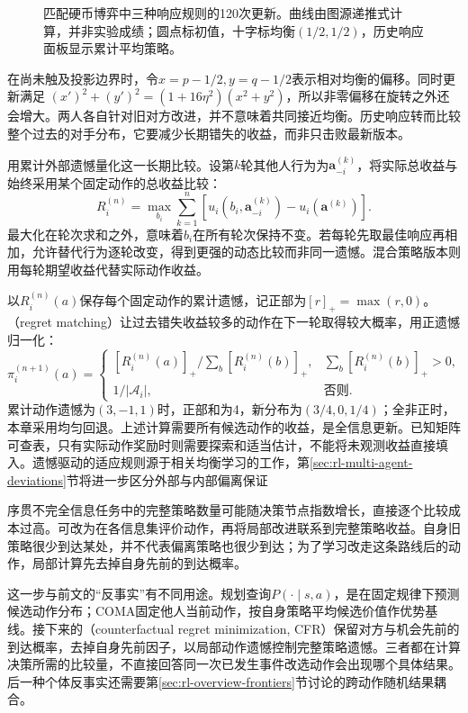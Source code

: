 \begin{figure}[htbp]
 \centering
 
 \caption{匹配硬币博弈中三种响应规则的120次更新。曲线由图源递推式计算，并非实验成绩；圆点标初值，十字标均衡$(1/2,1/2)$，历史响应面板显示累计平均策略。}
 \label{fig:rl-multi-agent-trajectories}
\end{figure}

在尚未触及投影边界时，令$x=p-1/2,y=q-1/2$表示相对均衡的偏移。同时更新满足
$(x')^2+(y')^2=(1+16\eta^2)(x^2+y^2)$，所以非零偏移在旋转之外还会增大。两人各自针对旧对方改进，并不意味着共同接近均衡。历史响应转而比较整个过去的对手分布，它要减少长期错失的收益，而非只击败最新版本。

用累计外部遗憾量化这一长期比较。设第$k$轮其他人行为为$\bm a_{-i}^{(k)}$，将实际总收益与始终采用某个固定动作的总收益比较：
\begin{equation}
 R_i^{(n)}
 =\max_{b_i}\sum_{k=1}^{n}
   [u_i(b_i,\bm a_{-i}^{(k)})
        -u_i(\bm a^{(k)})].
 \label{eq:rl-multi-agent-external-regret}
\end{equation}
最大化在轮次求和之外，意味着$b_i$在所有轮次保持不变。若每轮先取最佳响应再相加，允许替代行为逐轮改变，得到更强的动态比较而非同一遗憾。混合策略版本则用每轮期望收益代替实际动作收益。

以$R_i^{(n)}(a)$保存每个固定动作的累计遗憾，记正部为$[r]_+=\max(r,0)$。（regret matching）让过去错失收益较多的动作在下一轮取得较大概率，用正遗憾归一化：
\[
 \pi_i^{(n+1)}(a)=
 \begin{cases}
 [R_i^{(n)}(a)]_+/\sum_b[R_i^{(n)}(b)]_+,
       &\sum_b[R_i^{(n)}(b)]_+>0,\\
 1/|\mathcal A_i|,&\text{否则}.
 \end{cases}
\]
累计动作遗憾为$(3,-1,1)$时，正部和为4，新分布为$(3/4,0,1/4)$；全非正时，本章采用均匀回退。上述计算需要所有候选动作的收益，是全信息更新。已知矩阵可查表，只有实际动作奖励时则需要探索和适当估计，不能将未观测收益直接填入。遗憾驱动的适应规则源于相关均衡学习的工作，第\ref{sec:rl-multi-agent-deviations}节将进一步区分外部与内部偏离保证

序贯不完全信息任务中的完整策略数量可能随决策节点指数增长，直接逐个比较成本过高。可改为在各信息集评价动作，再将局部改进联系到完整策略收益。自身旧策略很少到达某处，并不代表偏离策略也很少到达；为了学习改走这条路线后的动作，局部计算先去掉自身先前的到达概率。

这一步与前文的“反事实”有不同用途。规划查询$P(\cdot\mid s,a)$，是在固定规律下预测候选动作分布；COMA固定他人当前动作，按自身策略平均候选价值作优势基线。接下来的（counterfactual regret minimization, CFR）保留对方与机会先前的到达概率，去掉自身先前因子，以局部动作遗憾控制完整策略遗憾。三者都在计算决策所需的比较量，不直接回答同一次已发生事件改选动作会出现哪个具体结果。后一种个体反事实还需要第\ref{sec:rl-overview-frontiers}节讨论的跨动作随机结果耦合。

